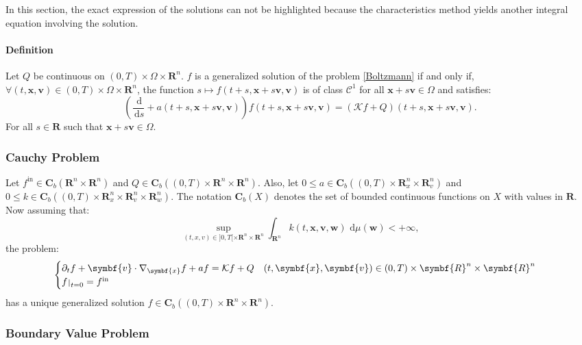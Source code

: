 \documentclass[a4paper, 11pt]{article}
\newcommand{\bm}{\symbf}
\newcommand{\di}{\ensuremath{\, \mathrm{d}}}
\def\restriction#1#2{\mathchoice
	{\setbox1\hbox{${\displaystyle #1}_{\scriptstyle #2}$}
		\restrictionaux{#1}{#2}}
	{\setbox1\hbox{${\textstyle #1}_{\scriptstyle #2}$}
		\restrictionaux{#1}{#2}}
	{\setbox1\hbox{${\scriptstyle #1}_{\scriptscriptstyle #2}$}
		\restrictionaux{#1}{#2}}
	{\setbox1\hbox{${\scriptscriptstyle #1}_{\scriptscriptstyle #2}$}
		\restrictionaux{#1}{#2}}}
\def\restrictionaux#1#2{{#1\,\smash{\vrule height .8\ht1 depth .85\dp1}}_{\,#2}}
\begin{document}
In this section, the exact expression of the solutions can not be highlighted because the characteristics method yields another integral equation involving the solution.


\paragraph{Definition}

Let $Q$ be continuous on $(0,T)\times \Omega \times \bm{R}^n$. $f$ is a generalized solution of the problem \eqref{Boltzmann} if and only if, $\forall (t,\bm{x},\bm{v}) \in (0,T)\times \Omega \times \bm{R}^n$, the function $ s \mapsto f(t+s,\bm{x}+s\bm{v},\bm{v}) $	is of class $\mathcal{C}^1$ for all $\bm{x}+s\bm{v} \in \Omega$ and satisfies:
\[ \left(\frac{\di}{\di s} +a(t+s,\bm{x}+s\bm{v},\bm{v})\right)f(t+s,\bm{x}+s\bm{v},\bm{v}) = (\mathcal{K}f+ Q)(t+s,\bm{x}+s\bm{v},\bm{v}). 
\]
For all $s \in \bm{R}$ such that $\bm{x} +s\bm{v} \in \Omega$.

\subsubsection{Cauchy Problem}

Let $f^{\mathrm{in}} \in \mathbf{C}_b(\bm{R}^n \times \bm{R}^n)$ and $Q \in \mathbf{C}_b((0,T) \times \bm{R}^n \times \bm{R}^n)$. Also, let $0 \leq a \in \mathbf{C}_b((0,T) \times \bm{R}_x^n \times \bm{R}_v^n)$ and $0 \leq k \in \mathbf{C}_b((0,T) \times \bm{R}_x^n \times \bm{R}_v^n \times \bm{R}_w^n)$. The notation $\mathbf{C}_b(X)$ denotes the set of bounded continuous functions on $X$ with values in $\bm{R}$.
\medbreak
Now assuming that:  
\[ \underset{(t,x,v) \in ]0,T[ \times \bm{R}^n \times \bm{R}^n}{\sup} \int_{\bm{R}^n} k(t,\bm{x},\bm{v},\bm{w}) \, \di\mu(\bm{w}) < +\infty, \]
the problem:
\[
\begin{cases}
\partial_t f +\bm{v} \cdot \nabla_{\bm{x}} f + a f = \mathcal{K} f + Q \quad (t,\bm{x},\bm{v}) \in (0,T) \times \bm{R}^n \times \bm{R}^n\\
\restriction{f}{t=0}= f^{\mathrm{in}}
\end{cases}
\]
has a unique generalized solution $f \in \mathbf{C}_b((0,T) \times \bm{R}^n \times \bm{R}^n)$.

\subsubsection{Boundary Value Problem}
\end{document}
